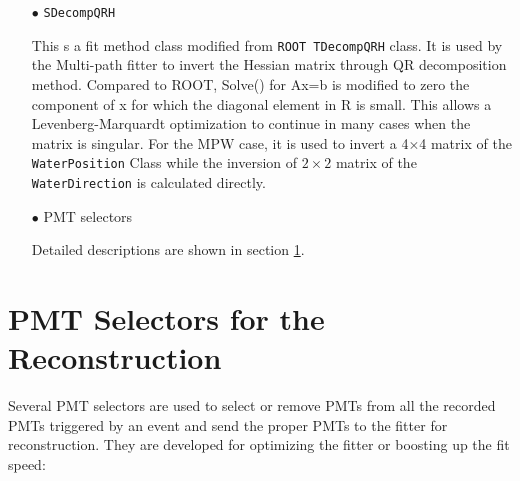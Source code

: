 \begin{itemize}
	\item[$\bullet$] \texttt{SDecompQRH}
	
	This s a fit method class modified from \texttt{ROOT TDecompQRH} class\cite{TDecompQRH}. It is used by the Multi-path fitter to invert the Hessian matrix through QR decomposition method\cite{press2007numerical}. Compared to ROOT, Solve() for Ax=b is modified to zero the component of x for which the diagonal element in R is small. This allows a Levenberg-Marquardt optimization to continue in many cases
	when the matrix is singular. For the MPW case, it is used to invert a 4$\times$4 matrix of the \texttt{WaterPosition} Class while the inversion of $2\times2$ matrix of the \texttt{WaterDirection} is calculated directly\cite{waterunidoc}.
	
	\item[$\bullet$] PMT selectors
	
	Detailed descriptions are shown in section \ref{sect:PMTselector}.
	
\end{itemize}

\section{PMT Selectors for the Reconstruction}\label{sect:PMTselector}
Several PMT selectors are used to select or remove PMTs from all the recorded PMTs triggered by an event and send the proper PMTs to the fitter for reconstruction. They are developed for optimizing the fitter or boosting up the fit speed:

